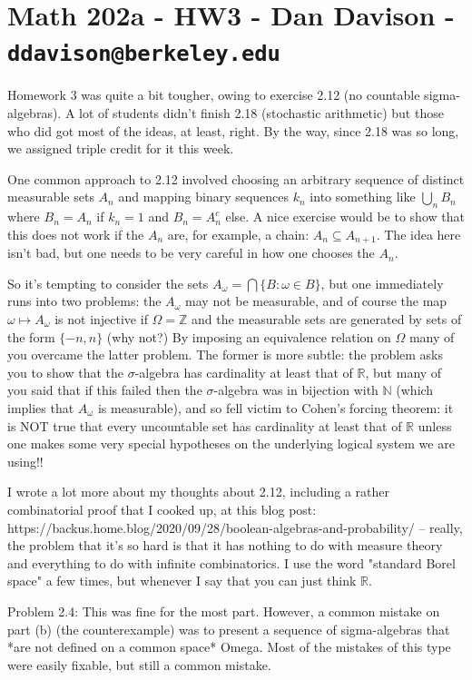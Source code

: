 \section*{Math 202a - HW3 - Dan Davison - \texttt{ddavison@berkeley.edu}}

Homework 3 was quite a bit tougher, owing to exercise 2.12 (no countable sigma-algebras). A lot of students didn't finish 2.18 (stochastic arithmetic) but those who did got most of the ideas, at least, right. By the way, since 2.18 was so long, we assigned triple credit for it this week.

One common approach to 2.12 involved choosing an arbitrary sequence of distinct measurable sets $A_n$ and mapping binary sequences $k_n$ into something like $\bigcup_n B_n$ where $B_n = A_n$ if $k_n = 1$ and $B_n = A_n^c$ else. A nice exercise would be to show that this does not work if the $A_n$ are, for example, a chain: $A_n \subseteq A_{n+1}$. The idea here isn't bad, but one needs to be very careful in how one chooses the $A_n$.

So it's tempting to consider the sets $A_\omega = \bigcap \{B: \omega \in B\}$, but one immediately runs into two problems: the $A_\omega$ may not be measurable, and of course the map $\omega \mapsto A_\omega$ is not injective if $\Omega = \mathbb Z$ and the measurable sets are generated by sets of the form $\{-n, n\}$ (why not?) By imposing an equivalence relation on $\Omega$ many of you overcame the latter problem. The former is more subtle: the problem asks you to show that the $\sigma$-algebra has cardinality at least that of $\mathbb R$, but many of you said that if this failed then the $\sigma$-algebra was in bijection with $\mathbb N$ (which implies that $A_\omega$ is measurable), and so fell victim to Cohen's forcing theorem: it is NOT true that every uncountable set has cardinality at least that of $\mathbb R$ unless one makes some very special hypotheses on the underlying logical system we are using!!

I wrote a lot more about my thoughts about 2.12, including a rather combinatorial proof that I cooked up, at this blog post: https://backus.home.blog/2020/09/28/boolean-algebras-and-probability/ -- really, the problem that it's so hard is that it has nothing to do with measure theory and everything to do with infinite combinatorics. I use the word "standard Borel space" a few times, but whenever I say that you can just think $\mathbb R$.

Problem 2.4: This was fine for the most part. However, a common mistake on part (b) (the counterexample) was to present a sequence of sigma-algebras that *are not defined on a common space* Omega. Most of the mistakes of this type were easily fixable, but still a common mistake.

